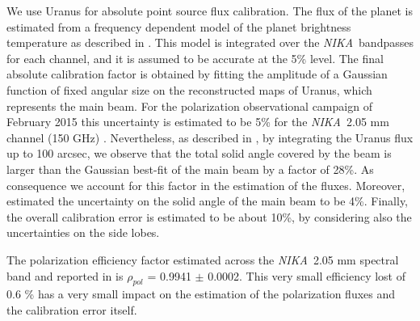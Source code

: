 \documentclass[twocolumn,traditabstract]{aa}
\def\NIKA{\textit{NIKA}}
\begin{document}
We use Uranus for absolute point source flux calibration. The flux of the planet is estimated from a frequency dependent model of the planet brightness temperature as described in \cite{moreno2010}. 
This model is integrated over the \NIKA\ bandpasses for each channel, and it is assumed to be accurate at the 5\% level. The final absolute calibration factor is obtained by fitting the amplitude of a Gaussian function of fixed angular size on the reconstructed maps of Uranus, which represents the main beam. For the polarization observational campaign of February 2015 this uncertainty is estimated to be 5\% for the \NIKA\ 2.05 mm channel (150 GHz) \citep{ritacco2017}. 
Nevertheless, as described in \cite{adam2013, catalano2014}, by integrating the Uranus flux up to 100 arcsec, we observe that the total solid angle covered by the beam is larger than the Gaussian best-fit of the main beam by a factor of 28\%. As consequence we account for this factor in the estimation of the fluxes.
Moreover, \cite{adam2013} estimated the uncertainty on the solid angle of the main beam to be 4\%.
Finally, the overall calibration error is estimated to be about 10\%, by considering also the uncertainties on the side lobes.

The polarization efficiency factor estimated across the \NIKA\ 2.05 mm spectral band and reported in \cite{ritacco2017} is $\rho_{pol}$ = 0.9941 $\pm$ 0.0002. This very small efficiency lost of 0.6 \% has a very small impact on the estimation of the polarization fluxes and the calibration error itself. 
\end{document}
